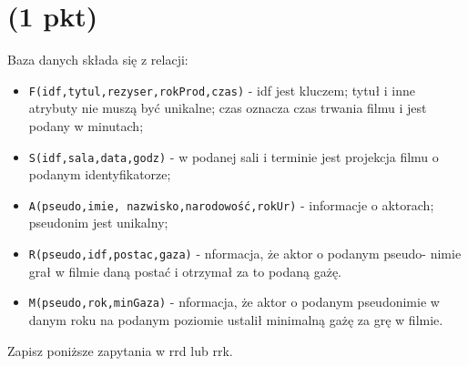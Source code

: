 \documentclass{article}
\begin{document}
\section{(1 pkt)}
Baza danych składa się z relacji:
\begin{itemize}
        \item \texttt{F(idf,tytul,rezyser,rokProd,czas)} - idf jest kluczem; tytuł i inne
        atrybuty nie muszą być unikalne; czas oznacza czas trwania filmu i jest
        podany w minutach;
        \item \texttt{S(idf,sala,data,godz)} - w podanej sali i terminie jest projekcja filmu o
        podanym identyfikatorze;
        \item \texttt{A(pseudo,imie, nazwisko,narodowość,rokUr)} - informacje o aktorach;
        pseudonim jest unikalny;
        \item \texttt{R(pseudo,idf,postac,gaza)} - nformacja, że aktor o podanym pseudo-
        nimie grał w filmie daną postać i otrzymał za to podaną gażę.
        \item \texttt{M(pseudo,rok,minGaza)} - nformacja, że aktor o podanym pseudonimie
        w danym roku na podanym poziomie ustalił minimalną gażę za grę w filmie.
\end{itemize}
Zapisz poniższe zapytania w rrd lub rrk.
\end{document}
